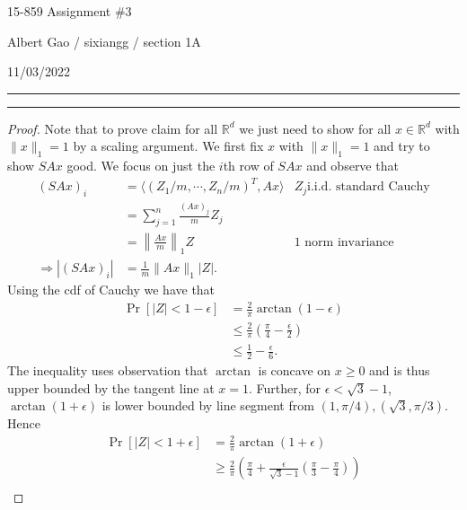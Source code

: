 \documentclass[11pt]{article}
\newcommand{\question}[1] {\vspace{.3in} \hrule\vspace{0.3em}
\noindent{\bf #1} \vspace{0.7em}
\hrule \vspace{.10in}}
\newcommand{\myinfo}{Albert Gao / sixiangg}
\newcommand{\myhwnum}{3}
\newcommand{\currdate}{11/03/2022}
\begin{document}
\bigskip                        %

\thispagestyle{plain}
\begin{center}                  %
{\Huge 15-859 Assignment \#\myhwnum}

\vspace{0.3cm}

\large{\myinfo { / section 1A}}

\large{\currdate}

\end{center}

\question{Task 1}
\begin{proof}
Note that to prove claim for all $\mathbb{R}^d$ we just need to show for all $x \in \mathbb{R}^d$ with $\|x\|_1 = 1$ by a scaling argument. We first fix $x$ with $\|x\|_1 = 1$ and try to show $SAx$ good. We focus on just the $i$th row of $SAx$ and observe that
\begin{align*}
  (SAx)_i &= \langle (Z_1/m, \cdots, Z_n/m)^T, Ax \rangle &Z_j \text{i.i.d. standard Cauchy}\\
  &= \sum_{j=1}^n \frac{(Ax)_j}{m}Z_j\\
  &= \left\| \frac{Ax}{m}\right\|_1 Z &\text{1 norm invariance}\\
  \Rightarrow |(SAx)_i| &= \frac{1}{m} \|Ax\|_1 |Z|.
\end{align*}
Using the cdf of Cauchy we have that
\begin{align*}
  \Pr[|Z| < 1 - \epsilon] &= \frac{2}{\pi} \arctan\left(1 - \epsilon\right)\\
  &\le \frac{2}{\pi} \left( \frac{\pi}{4} - \frac{\epsilon}{2} \right)\\
  &\le \frac{1}{2} - \frac{\epsilon}{6}.
\end{align*}
The inequality uses observation that $\arctan$ is concave on $x \ge 0$ and is thus upper bounded by the tangent line at $x = 1$. Further, for $\epsilon < \sqrt{3} - 1$, $\arctan(1 + \epsilon)$ is lower bounded by line segment from $(1, \pi/4), (\sqrt{3}, \pi/3)$. Hence
\begin{align*}
  \Pr[|Z| < 1 + \epsilon] &= \frac{2}{\pi} \arctan\left(1 + \epsilon\right)\\
  &\ge \frac{2}{\pi} \left(\frac{\pi}{4} + \frac{\epsilon}{\sqrt{3}-1} \left(\frac{\pi}{3} - \frac{\pi}{4}\right)\right)\\

\end{align*}
\end{proof}
\end{document}
